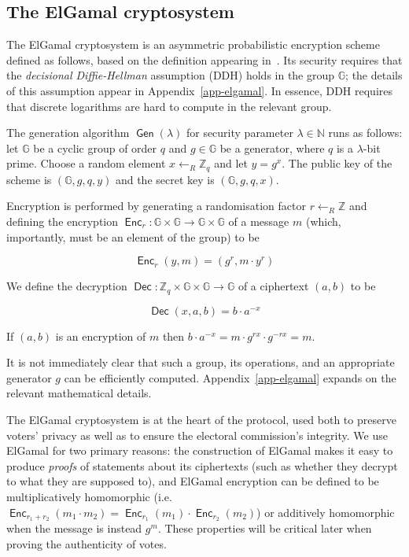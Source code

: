 \documentclass[12pt,a4paper]{article}
\DeclareMathOperator{\Gen}{\mathsf{Gen}}
\DeclareMathOperator{\Enc}{\mathsf{Enc}}
\DeclareMathOperator{\Dec}{\mathsf{Dec}}
\theoremstyle{definition}
\begin{document}
\subsection{The ElGamal cryptosystem}
The ElGamal cryptosystem is an asymmetric probabilistic encryption scheme defined as follows, based on the definition appearing in~\cite{katz2014introduction}. Its security requires that the \textit{decisional Diffie-Hellman} assumption (DDH) holds in the group $\mathbb{G}$; the details of this assumption appear in Appendix~\ref{app-elgamal}. In essence, DDH requires that discrete logarithms are hard to compute in the relevant group.

\begin{definition}\label{def-elgamal}
    The generation algorithm $\Gen(\lambda)$ for security parameter $\lambda\in\mathbb{N}$ runs as follows: let $\mathbb{G}$ be a cyclic group of order $q$ and $g\in\mathbb{G}$ be a generator, where $q$ is a $\lambda$-bit prime. Choose a random element $x\gets_R\mathbb{Z}_q$ and let $y=g^x$. 
    The public key of the scheme is $(\mathbb{G}, g, q, y)$ and the secret key is $(\mathbb{G}, g, q, x)$. 

    Encryption is performed by generating a randomisation factor $r\gets_R\mathbb{Z}$ and defining the encryption $\Enc_r:\mathbb{G}\times\mathbb{G}\rightarrow\mathbb{G}\times\mathbb{G}$ of a message $m$ (which, importantly, must be an element of the group) to be
    
    $$\Enc_r(y, m) = (g^r, m\cdot y^r)$$

    We define the decryption $\Dec:\mathbb{Z}_q\times\mathbb{G}\times\mathbb{G}\rightarrow \mathbb{G}$ of a ciphertext $(a, b)$ to be
    
    $$\Dec(x, a, b)=b\cdot a^{-x}$$

    If $(a, b)$ is an encryption of $m$ then $b\cdot a^{-x}=m\cdot g^{rx}\cdot g^{-rx}=m$.
\end{definition}
It is not immediately clear that such a group, its operations, and an appropriate generator $g$ can be efficiently computed. Appendix~\ref{app-elgamal} expands on the relevant mathematical details.

The ElGamal cryptosystem is at the heart of the protocol, used both to preserve voters' privacy as well as to ensure the electoral commission's integrity. We use ElGamal for two primary reasons: the construction of ElGamal makes it easy to produce \textit{proofs} of statements about its ciphertexts (such as whether they decrypt to what they are supposed to), and ElGamal encryption can be defined to be multiplicatively homomorphic (i.e. $\Enc_{r_1+r_2}(m_1\cdot m_2)=\Enc_{r_1}(m_1)\cdot\Enc_{r_2}(m_2)$) or additively homomorphic when the message is instead $g^m$. These properties will be critical later when proving the authenticity of votes.
\end{document}
